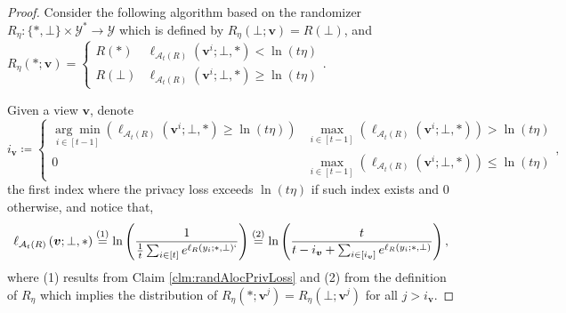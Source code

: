 \documentclass{article}
\theoremstyle{plain}
\theoremstyle{definition}
\newcommand{\eqExp}[2]{\overset{(#1)}{#2}}
\newcommand{\out}{y}
\newcommand{\outDom}{\mathcal{Y}}
\newcommand{\rand}{R}
\newcommand{\view}{\boldsymbol{v}}
\newcommand{\lossAlg}[4]{\ell_{#1}\left(#2; #3, #4 \right)}
\newcommand{\alloc}[2]{\mathcal{A}_{#1}\left(#2\right)}
\begin{document}
\begin{proof}
    Consider the following algorithm based on the randomizer $\rand_{\eta} : \{*, \bot \} \times \outDom^{*} \rightarrow \outDom$ which is defined by $\rand_{\eta}(\bot; \view) = \rand(\bot)$, and $\rand_{\eta}(*; \view) = \begin{cases}
        \rand(*) & \lossAlg{\alloc{t}{\rand}}{\view^{i}}{\bot}{*} < \ln(t \eta)
        \\ \rand(\bot) & \lossAlg{\alloc{t}{\rand}}{\view^{i}}{\bot}{*} \ge \ln(t \eta)
    \end{cases}$.

    Given a view $\view$, denote
    \[
        i_{\view} \coloneqq \begin{cases}
            \underset{i \in [t-1]}{\arg \min} \left(\lossAlg{\alloc{t}{\rand}}{\view^{i}}{\bot}{*} \ge \ln(t \eta) \right) & \underset{i \in [t-1]}{\max} \left(\lossAlg{\alloc{t}{\rand}}{\view^{i}}{\bot}{*} \right) > \ln(t \eta)
            \\ 0 & \underset{i \in [t-1]}{\max} \left(\lossAlg{\alloc{t}{\rand}}{\view^{i}}{\bot}{*} \right) \le \ln(t \eta)
        \end{cases},
    \]
    the first index where the privacy loss exceeds $\ln(t \eta)$ if such index exists and $0$ otherwise, and notice that,
    \[
        \lossAlg{\alloc{t}{\rand}}{\view}{\bot}{*} \eqExp{1}{=} \ln\left(\frac{1}{\frac{1}{t} \sum_{i \in [t]} e^{\lossAlg{\rand}{\out_{i}}{*}{\bot}`}} \right) \eqExp{2}{=} \ln\left(\frac{t}{t - i_{\view} + \sum_{i \in [i_{\view}]} e^{\lossAlg{\rand}{\out_{i}}{*}{\bot}}} \right),
    \]
    where (1) results from Claim \ref{clm:randAlocPrivLoss} and (2) from the definition of $\rand_{\eta}$ which implies the distribution of $\rand_{\eta}(*; \view^{j}) = \rand_{\eta}(\bot; \view^{j})$ for all $j > i_{\view}$.


\end{proof}
\end{document}
